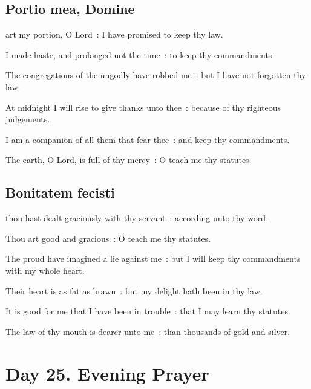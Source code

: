 \subsection{Portio mea, Domine}
 art my portion, O Lord~: I have promised to keep thy law.\par
{}
I made haste, and prolonged not the time~: to keep thy commandments.\par
{}The congregations of the ungodly have robbed me~: but I have not forgotten thy law.\par
{}At midnight I will rise to give thanks unto thee~: because of thy righteous judgements.\par
{}I am a companion of all them that fear thee~: and keep thy commandments.\par
{}The earth, O Lord, is full of thy mercy~: O teach me thy statutes.\par

\subsection{Bonitatem fecisti}
 thou hast dealt graciously with thy servant~: according unto thy word.\par
{}
Thou art good and gracious~: O teach me thy statutes.\par
{}The proud have imagined a lie against me~: but I will keep thy commandments with my whole heart.\par
{}Their heart is as fat as brawn~: but my delight hath been in thy law.\par
{}It is good for me that I have been in trouble~: that I may learn thy statutes.\par
{}The law of thy mouth is dearer unto me~: than thousands of gold and silver.\par

\clearpage
\section*{Day 25. Evening Prayer}

